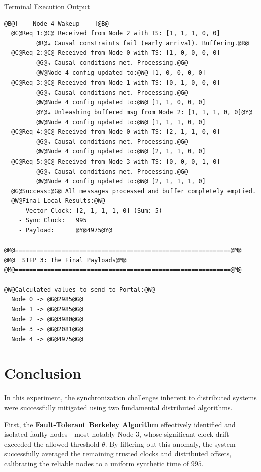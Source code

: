 \documentclass[11pt]{article}
\begin{document}
\begin{terminalbox}{Terminal Execution Output}
\begin{lstlisting}[style=terminalstyle]
@B@[--- Node 4 Wakeup ---]@B@
  @C@Req 1:@C@ Received from Node 2 with TS: [1, 1, 1, 0, 0]
         @R@↳ Causal constraints fail (early arrival). Buffering.@R@
  @C@Req 2:@C@ Received from Node 0 with TS: [1, 0, 0, 0, 0]
         @G@↳ Causal conditions met. Processing.@G@
         @W@Node 4 config updated to:@W@ [1, 0, 0, 0, 0]
  @C@Req 3:@C@ Received from Node 1 with TS: [0, 1, 0, 0, 0]
         @G@↳ Causal conditions met. Processing.@G@
         @W@Node 4 config updated to:@W@ [1, 1, 0, 0, 0]
         @Y@↳ Unleashing buffered msg from Node 2: [1, 1, 1, 0, 0]@Y@
         @W@Node 4 config updated to:@W@ [1, 1, 1, 0, 0]
  @C@Req 4:@C@ Received from Node 0 with TS: [2, 1, 1, 0, 0]
         @G@↳ Causal conditions met. Processing.@G@
         @W@Node 4 config updated to:@W@ [2, 1, 1, 0, 0]
  @C@Req 5:@C@ Received from Node 3 with TS: [0, 0, 0, 1, 0]
         @G@↳ Causal conditions met. Processing.@G@
         @W@Node 4 config updated to:@W@ [2, 1, 1, 1, 0]
  @G@Success:@G@ All messages processed and buffer completely emptied.
  @W@Final Local Results:@W@
    - Vector Clock: [2, 1, 1, 1, 0] (Sum: 5)
    - Sync Clock:   995
    - Payload:      @Y@4975@Y@

@M@============================================================@M@
@M@  STEP 3: The Final Payloads@M@
@M@============================================================@M@

@W@Calculated values to send to Portal:@W@
  Node 0 -> @G@2985@G@
  Node 1 -> @G@2985@G@
  Node 2 -> @G@3980@G@
  Node 3 -> @G@2081@G@
  Node 4 -> @G@4975@G@
\end{lstlisting}
\end{terminalbox}

\section{Conclusion}

In this experiment, the synchronization challenges inherent to distributed systems were successfully mitigated using two fundamental distributed algorithms. 

First, the \textbf{Fault-Tolerant Berkeley Algorithm} effectively identified and isolated faulty nodes—most notably Node 3, whose significant clock drift exceeded the allowed threshold $\theta$. By filtering out this anomaly, the system successfully averaged the remaining trusted clocks and distributed offsets, calibrating the reliable nodes to a uniform synthetic time of $995$.
\end{document}
